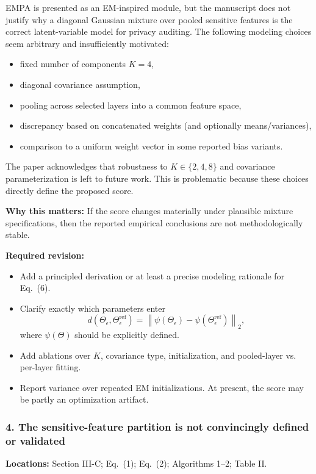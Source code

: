 EMPA is presented as an EM-inspired module, but the manuscript does not justify why a diagonal Gaussian mixture over pooled sensitive features is the correct latent-variable model for privacy auditing. The following modeling choices seem arbitrary and insufficiently motivated:
\begin{itemize}
    \item fixed number of components $K=4$,
    \item diagonal covariance assumption,
    \item pooling across selected layers into a common feature space,
    \item discrepancy based on concatenated weights (and optionally means/variances),
    \item comparison to a uniform weight vector in some reported bias variants.
\end{itemize}

The paper acknowledges that robustness to $K \in \{2,4,8\}$ and covariance parameterization is left to future work. This is problematic because these choices directly define the proposed score.

\textbf{Why this matters:} If the score changes materially under plausible mixture specifications, then the reported empirical conclusions are not methodologically stable.

\textbf{Required revision:}
\begin{itemize}
    \item Add a principled derivation or at least a precise modeling rationale for Eq.~(6).
    \item Clarify exactly which parameters enter
    \begin{equation}
    d\!\left(\Theta_{\epsilon}, \Theta^{\mathrm{ref}}_{\epsilon}\right)
    = \left\| \psi\!\left(\Theta_{\epsilon}\right) - \psi\!\left(\Theta^{\mathrm{ref}}_{\epsilon}\right) \right\|_2,
    \end{equation}
    where $\psi(\Theta)$ should be explicitly defined.
    \item Add ablations over $K$, covariance type, initialization, and pooled-layer vs. per-layer fitting.
    \item Report variance over repeated EM initializations. At present, the score may be partly an optimization artifact.
\end{itemize}

\subsubsection*{4. The sensitive-feature partition is not convincingly defined or validated}
\textbf{Locations:} Section III-C; Eq.~(1); Eq.~(2); Algorithms 1--2; Table II.

